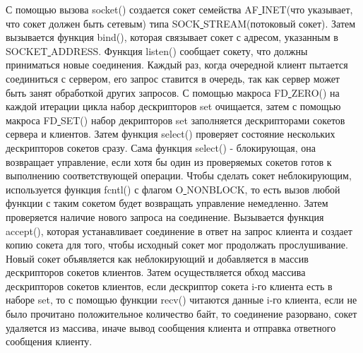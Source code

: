 \documentclass[a4paper,14pt]{extreport} %
\begin{document}
С помощью вызова socket() создается сокет семейства AF\underline{ }INET(что указывает, что сокет должен быть сетевым) типа SOCK\underline{ }STREAM(потоковый сокет). Затем вызывается функция bind(), которая связывает сокет с адресом, указанным в SOCKET\underline{ }ADDRESS. Функция listen() сообщает сокету, что должны приниматься новые соединения.
Каждый раз, когда очередной клиент пытается соединиться с сервером, его запрос ставится в очередь, так как сервер может быть занят обработкой других запросов. С помощью макроса FD\underline{ }ZERO() на каждой итерации цикла набор дескрипторов set очищается, затем с помощью макроса FD\underline{ }SET() набор декрипторов set заполняется дескрипторами сокетов сервера и клиентов. Затем функция select() проверяет состояние нескольких дескрипторов сокетов сразу. Сама функция select() - блокирующая, она возвращает управление, если хотя бы один из проверяемых сокетов готов к выполнению соответствующей операции. Чтобы сделать сокет неблокирующим, используется функция fcntl() с флагом O\underline{ }NONBLOCK, то есть вызов любой функции с таким сокетом будет возвращать управление немедленно. Затем проверяется наличие нового запроса на соединение. Вызывается функция accept(), которая устанавливает соединение в ответ на запрос клиента и создает копию сокета для того, чтобы исходный сокет мог продолжать прослушивание. Новый сокет объявляется как неблокирующий и добавляется в массив дескрипторов сокетов клиентов. Затем осуществляется обход массива дескрипторов сокетов клиентов, если дескриптор сокета i-го клиента есть в наборе set, то с помощью функции recv() читаются данные i-го клиента, если не было прочитано положительное количество байт, то соединение разорвано, сокет удаляется из массива, иначе вывод сообщения клиента и отправка ответного сообщения клиенту. 
\end{document}
